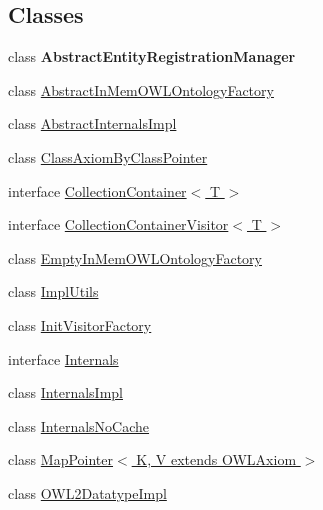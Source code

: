 \subsection*{Classes}
\begin{DoxyCompactItemize}
\item 
class {\bfseries Abstract\-Entity\-Registration\-Manager}
\item 
class \hyperlink{classuk_1_1ac_1_1manchester_1_1cs_1_1owl_1_1owlapi_1_1_abstract_in_mem_o_w_l_ontology_factory}{Abstract\-In\-Mem\-O\-W\-L\-Ontology\-Factory}
\item 
class \hyperlink{classuk_1_1ac_1_1manchester_1_1cs_1_1owl_1_1owlapi_1_1_abstract_internals_impl}{Abstract\-Internals\-Impl}
\item 
class \hyperlink{classuk_1_1ac_1_1manchester_1_1cs_1_1owl_1_1owlapi_1_1_class_axiom_by_class_pointer}{Class\-Axiom\-By\-Class\-Pointer}
\item 
interface \hyperlink{interfaceuk_1_1ac_1_1manchester_1_1cs_1_1owl_1_1owlapi_1_1_collection_container_3_01_t_01_4}{Collection\-Container$<$ T $>$}
\item 
interface \hyperlink{interfaceuk_1_1ac_1_1manchester_1_1cs_1_1owl_1_1owlapi_1_1_collection_container_visitor_3_01_t_01_4}{Collection\-Container\-Visitor$<$ T $>$}
\item 
class \hyperlink{classuk_1_1ac_1_1manchester_1_1cs_1_1owl_1_1owlapi_1_1_empty_in_mem_o_w_l_ontology_factory}{Empty\-In\-Mem\-O\-W\-L\-Ontology\-Factory}
\item 
class \hyperlink{classuk_1_1ac_1_1manchester_1_1cs_1_1owl_1_1owlapi_1_1_impl_utils}{Impl\-Utils}
\item 
class \hyperlink{classuk_1_1ac_1_1manchester_1_1cs_1_1owl_1_1owlapi_1_1_init_visitor_factory}{Init\-Visitor\-Factory}
\item 
interface \hyperlink{interfaceuk_1_1ac_1_1manchester_1_1cs_1_1owl_1_1owlapi_1_1_internals}{Internals}
\item 
class \hyperlink{classuk_1_1ac_1_1manchester_1_1cs_1_1owl_1_1owlapi_1_1_internals_impl}{Internals\-Impl}
\item 
class \hyperlink{classuk_1_1ac_1_1manchester_1_1cs_1_1owl_1_1owlapi_1_1_internals_no_cache}{Internals\-No\-Cache}
\item 
class \hyperlink{classuk_1_1ac_1_1manchester_1_1cs_1_1owl_1_1owlapi_1_1_map_pointer_3_01_k_00_01_v_01extends_01_o_w_l_axiom_01_4}{Map\-Pointer$<$ K, V extends O\-W\-L\-Axiom $>$}
\item 
class \hyperlink{classuk_1_1ac_1_1manchester_1_1cs_1_1owl_1_1owlapi_1_1_o_w_l2_datatype_impl}{O\-W\-L2\-Datatype\-Impl}

\end{DoxyCompactItemize}
